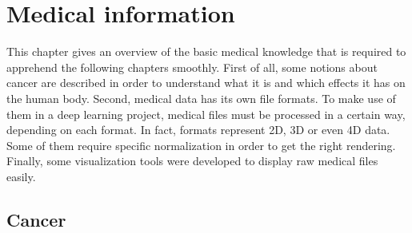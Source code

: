 
\chapter{Medical information}
\label{ch:medical}
\setlength{\marginparwidth}{3cm}\leavevmode {}This chapter gives an overview of the basic medical knowledge that is required to apprehend the following chapters smoothly. First of all, some notions about cancer are described in order to understand what it is and which effects it has on the human body. Second, medical data has its own file formats. To make use of them in a deep learning project, medical files must be processed in a certain way, depending on each format. In fact, formats represent 2D, 3D or even 4D data. Some of them require specific normalization in order to get the right rendering. Finally, some visualization tools were developed to display raw medical files easily. 


\section{Cancer}

